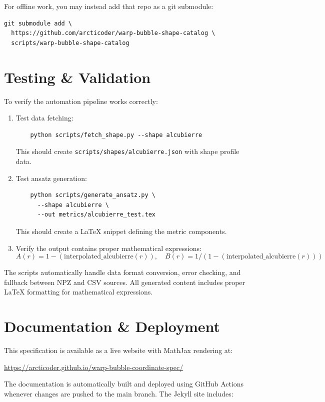 \documentclass[11pt]{article}
\begin{document}
For offline work, you may instead add that repo as a git submodule:
\begin{verbatim}
git submodule add \
  https://github.com/arcticoder/warp-bubble-shape-catalog \
  scripts/warp-bubble-shape-catalog
\end{verbatim}

\section{Testing \& Validation}
To verify the automation pipeline works correctly:

\begin{enumerate}
  \item Test data fetching:
    \begin{verbatim}
    python scripts/fetch_shape.py --shape alcubierre
    \end{verbatim}
    This should create \verb|scripts/shapes/alcubierre.json| with shape profile data.
    
  \item Test ansatz generation:
    \begin{verbatim}
    python scripts/generate_ansatz.py \
      --shape alcubierre \
      --out metrics/alcubierre_test.tex
    \end{verbatim}
    This should create a LaTeX snippet defining the metric components.
    
  \item Verify the output contains proper mathematical expressions:
    \[
      A(r) = 1 - (\text{interpolated\_alcubierre}(r)), \quad
      B(r) = 1 / (1 - (\text{interpolated\_alcubierre}(r)))
    \]
\end{enumerate}

The scripts automatically handle data format conversion, error checking, and fallback between NPZ and CSV sources. All generated content includes proper LaTeX formatting for mathematical expressions.

\section{Documentation \& Deployment}
This specification is available as a live website with MathJax rendering at:
\begin{center}
  \url{https://arcticoder.github.io/warp-bubble-coordinate-spec/}
\end{center}

The documentation is automatically built and deployed using GitHub Actions whenever changes are pushed to the main branch. The Jekyll site includes:
\end{document}
